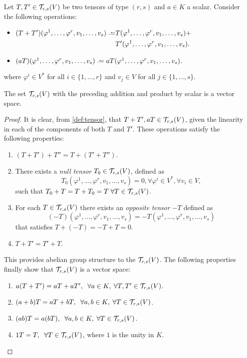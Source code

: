 \begin{theorem}
	Let $T, T' \in {\mathcal T}_{r,s}(V)$ be two tensors of type $(r,s)$ and $a \in K$ a scalar. Consider the following operations:
	\begin{itemize}
		\item $\begin{aligned}[t]
			(T+T') (\varphi^1, \dots, \varphi^r, v_1, \dots, v_s) \defeq &T(\varphi^1, \dots, \varphi^r, v_1, \dots, v_s) +\\
			&T'(\varphi^1, \dots, \varphi^r, v_1, \dots, v_s).
		\end{aligned}$
		\item $(a T)(\varphi^1, \dots, \varphi^r, v_1, \dots, v_s) \defeq a T(\varphi^1, \dots, \varphi^r, v_1, \dots, v_s)$.
	\end{itemize}
	where $\varphi^i \in V^*$ for all $i \in \{1,\dots,r\}$ and $v_j \in V$ for all $j \in \{1,\dots,s\}$.
	
	The set ${\mathcal T}_{r,s}(V)$ with the preceding addition and product by scalar is a vector space.
\end{theorem}

\begin{proof}
	It is clear, from \autoref{def:tensor}, that $T+T', aT \in {\mathcal T}_{r,s}(V)$, given the linearity in each of the components of both $T$ and $T'$.
	These operations satisfy the following properties:
	\begin{enumerate}
		\item $(T+T') + T'' = T + (T'+T'')$.
		\item There exists a \emph{null tensor} $T_0 \in {\mathcal T}_{r,s}(V)$, defined as \[T_0(\varphi^1, \dots, \varphi^r, v_1, \dots, v_s) = 0, \forall \varphi^i \in V^*, \forall v_i \in V,\] such that $T_0 + T = T + T_0 = T \;\forall T \in {\mathcal T}_{r,s}(V)$.
		\item For each $T\in{\mathcal T}_{r,s}(V)$ there exists an \emph{opposite tensor} $-T$ defined as \[(-T)(\varphi^1, \dots, \varphi^r, v_1, \dots, v_s) = - T(\varphi^1, \dots, \varphi^r, v_1, \dots, v_s)\] that satisfies $T + (-T) = -T + T = 0$.
		\item $T + T' = T' + T$.
	\end{enumerate}
	This provides abelian group structure to the ${\mathcal T}_{r,s}(V)$. The following properties finally show that ${\mathcal T}_{r,s}(V)$ is a vector space:
	\begin{enumerate}
		\item $a(T+T') = aT+ aT', \;\;\forall a \in K, \;\forall T,T' \in {\mathcal T}_{r,s}(V)$.
		\item $(a+b)T = aT + bT, \;\;\forall a,b \in K, \;\forall T \in {\mathcal T}_{r,s}(V)$.
		\item $(ab)T = a(bT), \;\;\forall a,b \in K, \;\forall T \in {\mathcal T}_{r,s}(V)$.
		\item $1T = T, \;\;\forall T \in {\mathcal T}_{r,s}(V)$, where $1$ is the unity in $K$.
	\end{enumerate}
\end{proof}

